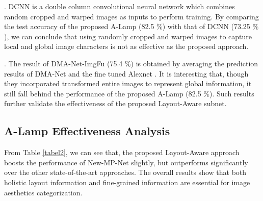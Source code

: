 \documentclass[10pt,twocolumn,letterpaper]{article}
\begin{document}
. DCNN \cite{Lu:2014:TMM:rating} is a double column convolutional neural network which combines random cropped and warped images as inputs to perform training. By comparing the test accuracy of the proposed A-Lamp (82.5 $\%$) with that of DCNN (73.25 $\%$), we can conclude that using randomly cropped and warped images to capture local and global image characters is not as effective as the proposed approach.

. The result of DMA-Net-ImgFu (75.4 $\%$) \cite{Lu:2015:ICCV} is obtained by averaging the prediction results of DMA-Net and the fine tuned Alexnet \cite{Alex:2012:NIPS:ImageNet}. It is interesting that, though they incorporated transformed entire images to represent global information, it still fall behind the performance of the proposed A-Lamp (82.5 $\%$). Such results further validate the effectiveness of the proposed Layout-Aware subnet. 


\subsection{A-Lamp Effectiveness Analysis}
From Table \ref{tabel2}, we can see that, the proposed Layout-Aware approach boosts the performance of New-MP-Net slightly, but outperforms significantly over the other state-of-the-art approaches. The overall results show that both holistic layout information and fine-grained information are essential for image aesthetics categorization. 
\end{document}
